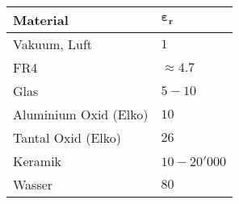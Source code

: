 \begin{center}
    \begin{tabular}{l | l }
        \textbf{Material}       &  $\bm{\varepsilon_r}$ \\
        \midrule
        Vakuum, Luft            & $1$                   \\
        FR4                     & $\approx 4.7$         \\
        Glas                    & $5-10$                \\
        Aluminium Oxid (Elko)   & $10$                  \\
        Tantal Oxid (Elko)      & $26$                  \\
        Keramik                 & $10 - 20'000$         \\
        Wasser                  & $80$  
    \end{tabular}
\end{center}

